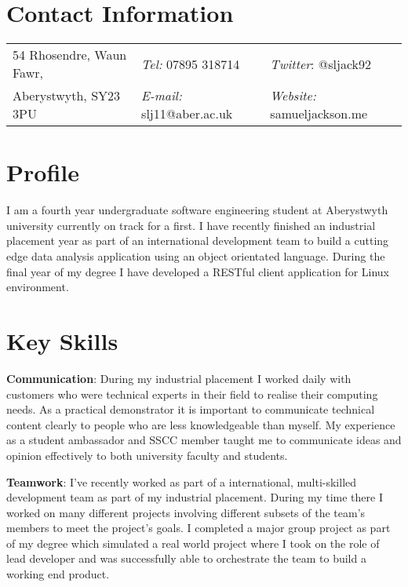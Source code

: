 \documentclass[margin,line]{res}
\begin{document}

\begin{resume}
\section{\sc Contact Information}
\vspace{.05in}
\begin{tabular}{@{}p{2in}p{2in}p{2in}}
54 Rhosendre, Waun Fawr,             & {\it Tel:}  07895 318714 & {\it Twitter}: @sljack92 \\
Aberystwyth, SY23 3PU & {\it E-mail:}  slj11@aber.ac.uk & {\it Website:} samueljackson.me \\
\end{tabular}

\section{\sc Profile}
I am a fourth year undergraduate software engineering student at Aberystwyth university currently on track for a first. I have recently finished an industrial placement year as part of an international development team to build a cutting edge data analysis application using an object orientated language. During the final year of my degree I have developed a RESTful client application for Linux environment.

\section{\sc Key Skills}

{\bf Communication}: During my industrial placement I worked daily with customers who were technical experts in their field to realise their computing needs. As a practical demonstrator it is important to communicate technical content clearly to people who are less knowledgeable than myself. My experience as a student ambassador and SSCC member taught me to communicate ideas and opinion effectively to both university faculty and students.

{\bf Teamwork}: I've recently worked as part of a international, multi-skilled development team as part of my industrial placement. During my time there I worked on many different projects involving different subsets of the team's members to meet the project's goals. I completed a major group project as part of my degree which simulated a real world project where I took on the role of lead developer and was successfully able to orchestrate the team to build a working end product.


\end{resume}
\end{document}

